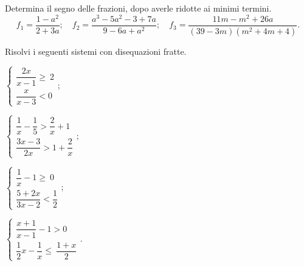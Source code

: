 \begin{esercizio}
\label{ese:20.71}
Determina il segno delle frazioni, dopo averle ridotte ai minimi termini.
\[f_{1}=\dfrac{1-a^{2}}{2+3a};\quad f_{2}=\dfrac{a^{3}-5a^{2}-3+7a}{9-6a+a^{2}};\quad f_{3}=\dfrac{11m-m^{2}+26a}{(39-3m)(m^{2}+4m+4)}.\]
\end{esercizio}

\begin{esercizio}[\Ast]
\label{ese:20.72}
Risolvi i seguenti sistemi con disequazioni fratte.
\begin{multicols}{2}
\begin{enumeratea}{\longarray
 \item $\left\{\begin{array}{l}
		\dfrac{2x}{x-1}\ge~2\\
		\dfrac{x}{x-3}<0
	\end{array}\right.;$
\item $\left\{\begin{array}{l}
        \dfrac{1}{x}-\dfrac{1}{5}>\dfrac{2}{x}+1\\
        \dfrac{3x-3}{2x}>1+\dfrac{2}{x}
       \end{array}\right.;$
\item $\left\{\begin{array}{l}
        \dfrac{1}{x}-1\ge~0\\
        \dfrac{5+2x}{3x-2}<\dfrac{1}{2}
	   \end{array}\right.;$
\item $\left\{\begin{array}{l}
	   \dfrac{x+1}{x-1}-1>0\\
	   \dfrac{1}{2}x-\dfrac{1}{x}\le~\dfrac{1+x}{2}
	   \end{array}\right..$}
\end{enumeratea}
\end{multicols}
\end{esercizio}

